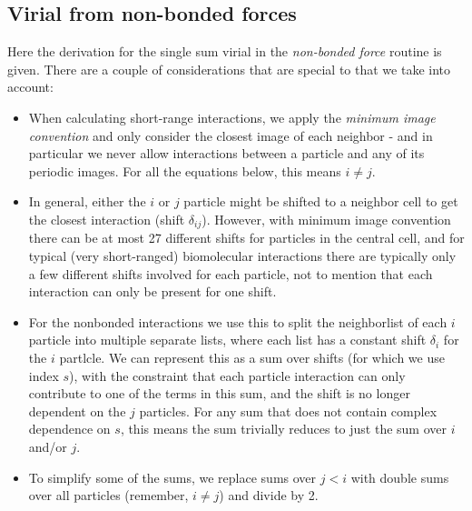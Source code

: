 \subsection{Virial from non-bonded forces}
Here the derivation for the single sum virial in the {\em non-bonded force} 
routine is given. There are a couple of considerations that are special
to {\gromacs} that we take into account:
\begin{itemize}
\item When calculating short-range interactions, we apply the 
{\em minimum image convention} and only consider the closest 
image of each neighbor - and in particular we never allow interactions
between a particle and any of its periodic images. For all the 
equations below, this means $i \neq j$.
\item In general, either the $i$ or $j$ particle might be shifted to a neighbor
cell to get the closest interaction (shift $\delta_{ij}$). However, with minimum image
convention there can be at most 27 different shifts for particles in the central cell,
and for typical (very short-ranged) biomolecular interactions there are typically only a few
different shifts involved for each particle, not to mention that each interaction can
only be present for one shift. 
\item For the {\gromacs} nonbonded interactions
we use this to split the neighborlist of each $i$ particle into multiple 
separate lists, where each list has a constant shift $\delta_i$ for the $i$ partlcle. We
can represent this as a sum over shifts (for which we use index $s$), with the constraint that
each particle interaction can only contribute to one of the terms in this sum, and the
shift is no longer dependent on the $j$ particles. For any sum that does not contain
complex dependence on $s$, this means the sum trivially reduces to just the sum
over $i$ and/or $j$.
\item To simplify some of the sums, we replace sums over $j<i$ with double sums over
all particles (remember, $i \neq j$) and divide by 2.
\end{itemize}

